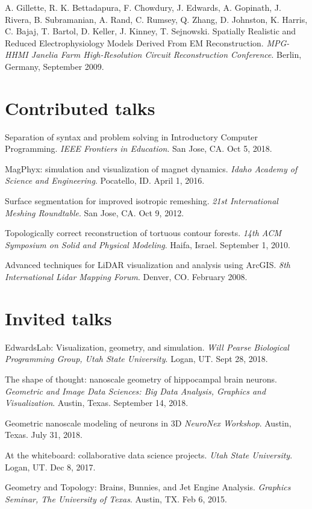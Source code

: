 \documentclass[margin,line]{res}
\begin{document}
\begin{resume}
\begin{LONG}
A. Gillette, R. K. Bettadapura, F. Chowdury, J. Edwards, A. Gopinath, J. Rivera, B. Subramanian, A. Rand, C. Rumsey, Q. Zhang, D. Johnston, K. Harris, C. Bajaj, T. Bartol, D. Keller, J. Kinney, T. Sejnowski. 
Spatially Realistic and Reduced Electrophysiology Models Derived From EM Reconstruction. 
\textit{MPG-HHMI Janelia Farm High-Resolution Circuit Reconstruction Conference}. Berlin, Germany, September 2009.


\section{\sc Contributed talks}
Separation of syntax and problem solving in Introductory Computer Programming.
\textit{IEEE Frontiers in Education}. San Jose, CA. Oct 5, 2018.

MagPhyx: simulation and visualization of magnet dynamics.
\textit{Idaho Academy of Science and Engineering}. Pocatello, ID. April 1, 2016.

Surface segmentation for improved isotropic remeshing.
\textit{21st International Meshing Roundtable}. San Jose, CA. Oct 9, 2012.

Topologically correct reconstruction of tortuous contour forests.
\textit{14th ACM Symposium on Solid and Physical Modeling}. Haifa, Israel. September 1, 2010.

Advanced techniques for LiDAR visualization and analysis using ArcGIS.
\textit{8th International Lidar Mapping Forum}. Denver, CO. February 2008.


\section{\sc Invited talks}
EdwardsLab: Visualization, geometry, and simulation.
\textit{Will Pearse Biological Programming Group, Utah State University}. Logan, UT. Sept 28, 2018.

The shape of thought: nanoscale geometry of hippocampal brain neurons.
\textit{Geometric and Image Data Sciences: Big Data Analysis, Graphics and Visualization}. Austin, Texas. September 14, 2018.

Geometric nanoscale modeling of neurons in 3D
\textit{NeuroNex Workshop}. Austin, Texas. July 31, 2018.

At the whiteboard: collaborative data science projects.
\textit{Utah State University}. Logan, UT. Dec 8, 2017.

Geometry and Topology: Brains, Bunnies, and Jet Engine Analysis.
\textit{Graphics Seminar, The University of Texas}. Austin, TX. Feb 6, 2015.


\end{LONG}
\end{resume}
\end{document}
